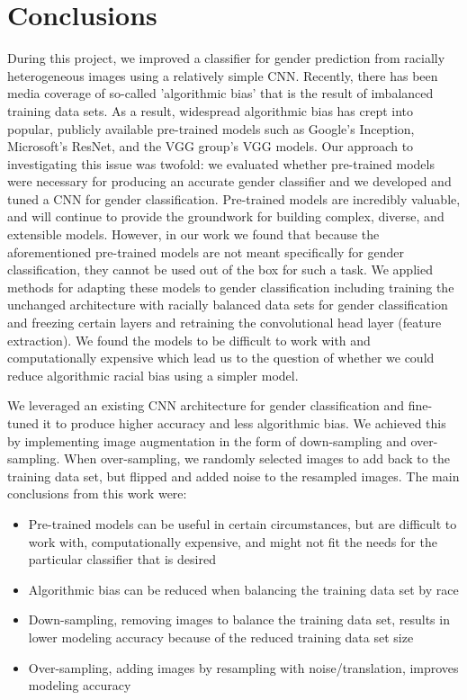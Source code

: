 \documentclass[obeyspaces, spaces, fleqn,10pt]{SelfArx} %
\begin{document}
\section{Conclusions}
During this project, we improved a classifier for gender prediction from racially heterogeneous images using a relatively simple CNN. Recently, there has been media coverage of so-called 'algorithmic bias' that is the result of imbalanced training data sets. As a result, widespread algorithmic bias has crept into popular, publicly available pre-trained models such as Google's Inception, Microsoft's ResNet, and the VGG group's VGG models. Our approach to investigating this issue was twofold: we evaluated whether pre-trained models were necessary for producing an accurate gender classifier and we developed and tuned a CNN for gender classification. Pre-trained models are incredibly valuable, and will continue to provide the groundwork for building complex, diverse, and extensible models. However, in our work we found that because the aforementioned pre-trained models are not meant specifically for gender classification, they cannot be used out of the box for such a task. We applied methods for adapting these models to gender classification including training the unchanged architecture with racially balanced data sets for gender classification and freezing certain layers and retraining the convolutional head layer (feature extraction). We found the models to be difficult to work with and computationally expensive which lead us to the question of whether we could reduce algorithmic racial bias using a simpler model.

We leveraged an existing CNN architecture for gender classification and fine-tuned it to produce higher accuracy and less algorithmic bias. We achieved this by implementing image augmentation in the form of down-sampling and over-sampling. When over-sampling, we randomly selected images to add back to the training data set, but flipped and added noise to the resampled images. The main conclusions from this work were:

\begin{itemize}
\item Pre-trained models can be useful in certain circumstances, but are difficult to work with, computationally expensive, and might not fit the needs for the particular classifier that is desired
\item Algorithmic bias can be reduced when balancing the training data set by race 
\item Down-sampling, removing images to balance the training data set, results in lower modeling accuracy because of the reduced training data set size
\item Over-sampling, adding images by resampling with noise/translation, improves modeling accuracy 
\end{itemize}
\end{document}
